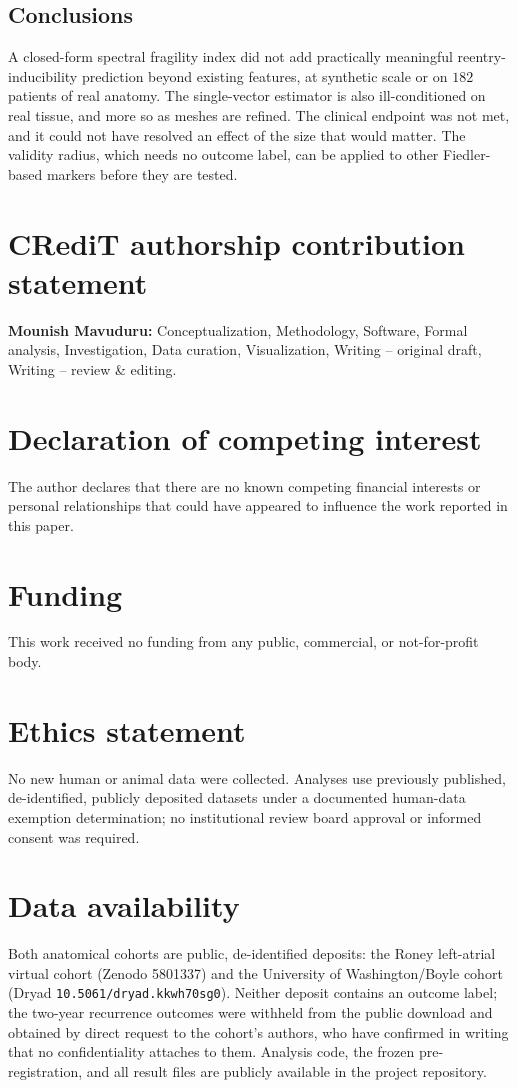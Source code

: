 \documentclass[11pt]{article}
\newcommand{\code}[1]{\texttt{#1}}
\begin{document}
\subsection*{Conclusions}

A closed-form spectral fragility index did not add practically meaningful
reentry-inducibility prediction beyond existing features, at synthetic scale or
on $182$ patients of real anatomy. The single-vector estimator is also
ill-conditioned on real tissue, and more so as meshes are refined. The clinical
endpoint was not met, and it could not have resolved an effect of the size that
would matter. The validity radius, which needs no outcome label, can be applied
to other Fiedler-based markers before they are tested.

\section*{CRediT authorship contribution statement}
\noindent\textbf{Mounish Mavuduru:} Conceptualization, Methodology, Software,
Formal analysis, Investigation, Data curation, Visualization, Writing -- original
draft, Writing -- review \& editing.

\section*{Declaration of competing interest}
The author declares that there are no known competing financial interests or
personal relationships that could have appeared to influence the work reported
in this paper.

\section*{Funding}
This work received no funding from any public, commercial, or not-for-profit
body.

\section*{Ethics statement}
No new human or animal data were collected. Analyses use previously published,
de-identified, publicly deposited datasets under a documented human-data
exemption determination; no institutional review board approval or informed
consent was required.

\section*{Data availability}
Both anatomical cohorts are public, de-identified deposits: the Roney
left-atrial virtual cohort (Zenodo 5801337) and the University of
Washington/Boyle cohort (Dryad \code{10.5061/dryad.kkwh70sg0}). Neither deposit
contains an outcome label; the two-year recurrence outcomes were withheld from
the public download and obtained by direct request to the cohort's authors, who
have confirmed in writing that no confidentiality attaches to them. Analysis
code, the frozen pre-registration, and all result files are publicly available
in the project repository.
\end{document}
